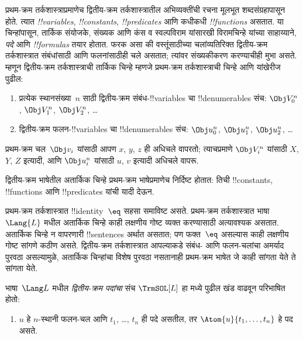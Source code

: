 \documentclass[../../../include/open-logic-section]{subfiles}
\begin{document}


प्रथम-क्रम
तर्कशास्त्राप्रमाणेच
द्वितीय-क्रम
तर्कशास्त्रातील
अभिव्यक्तींची
रचना मूलभूत
शब्दसंग्रहापासून
होते. त्यात
\emph{!!{variable}s},
\emph{!!{constant}s},
\emph{!!{predicate}s}
आणि कधीकधी
\emph{!!{function}s}
असतात.
या चिन्हांपासून,
तार्किक संयोजके,
संख्यक आणि कंस
व स्वल्पविराम
यांसारखी
विरामचिन्हे
यांच्या साहाय्याने,
\emph{पदे} आणि
\emph{!!{formula}s}
तयार होतात.
फरक असा की
वस्तूंसाठीच्या
चलांव्यतिरिक्त
द्वितीय-क्रम
तर्कशास्त्रात
संबंधांसाठी
आणि फलनांसाठीही
चले असतात;
त्यांवर
संख्यकीकरण
करण्याचीही
मुभा असते.
म्हणून द्वितीय-क्रम
तर्कशास्त्राची
तार्किक चिन्हे
म्हणजे प्रथम-क्रम
तर्कशास्त्राची
चिन्हे आणि
यांखेरीज पुढील:

\begin{enumerate}
\item प्रत्येक
  स्थानसंख्या~$n$
  साठी द्वितीय-क्रम
  संबंध-!!{variable}s
  चा !!{denumerable}s
  संच:
  $\Obj V_0^n$, $\Obj V_1^n$, $\Obj V_2^n$, \dots
\item द्वितीय-क्रम
  फलन-!!{variable}s
  चा !!{denumerable}s
  संच:
  $\Obj u_0^n$, $\Obj u_1^n$, $\Obj u_2^n$, \dots
\end{enumerate}

प्रथम-क्रम
चल~$\Obj v_i$
यांसाठी आपण
$x$, $y$, $z$
ही अधिचले
वापरतो; त्याचप्रमाणे
$\Obj V_i^n$
यांसाठी
$X$, $Y$, $Z$
इत्यादी, आणि
$\Obj u_i^n$
यांसाठी
$u$, $v$
इत्यादी अधिचले
वापरू.

\begin{explain}
द्वितीय-क्रम
भाषेतील अतार्किक
चिन्हे प्रथम-क्रम
भाषेप्रमाणेच
निर्दिष्ट होतात:
तिची !!{constant}s,
!!{function}s
आणि !!{predicate}s
यांची यादी देऊन.

प्रथम-क्रम
तर्कशास्त्रात
!!{identity}~$\eq$
सहसा समाविष्ट
असते.
प्रथम-क्रम
तर्कशास्त्रात
भाषा~$\Lang{L}$
मधील अतार्किक
चिन्हे काही
लक्षणीय गोष्ट
व्यक्त करण्यासाठी
अत्यावश्यक असतात.
अतार्किक चिन्हे
न वापरणारी
!!{sentence}s
अर्थात असतात;
पण फक्त~$\eq$
असल्यास काही
लक्षणीय गोष्ट
सांगणे कठीण
असते.
द्वितीय-क्रम
तर्कशास्त्रात
आपल्याकडे संबंध-
आणि फलन-चलांचा
अमर्याद पुरवठा
असल्यामुळे,
अतार्किक चिन्हांचा
विशेष पुरवठा
नसतानाही
प्रथम-क्रम
भाषेत जे काही
सांगता येते
ते सांगता येते.
\end{explain}

\begin{defn}[द्वितीय-क्रम पदे]
भाषा~$\Lang L$
मधील \emph{द्वितीय-क्रम
पदांचा} संच
$\TrmSOL[L]$
हा 
मध्ये पुढील
खंड वाढवून
परिभाषित होतो:
\begin{enumerate}
\item $u$ हे
  $n$-स्थानी
  फलन-चल
  आणि $t_1$,
  \dots, $t_n$
  ही पदे असतील,
  तर $\Atom{u}{t_1, \ldots, t_n}$
  हे पद असते.
\end{enumerate}
\end{defn}
\end{document}
